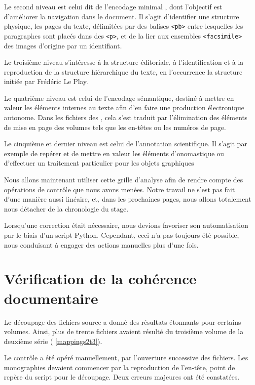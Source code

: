 Le second niveau est celui dit de l'encodage \og minimal \fg, dont l'objectif est d'améliorer la navigation dans le document. Il s'agit d'identifier une structure physique, les pages du texte, délimitées par des balises \texttt{<pb>} entre lesquelles les paragraphes sont placés dans des \texttt{<p>}, et de la lier aux ensembles \texttt{<facsimile>} des images d'origine par un identifiant.

Le troisième niveau s'intéresse à la structure éditoriale, \cad{} à l'identification et à la reproduction de la structure hiérarchique du texte, en l'occurrence la structure initiée par Frédéric Le Play.

Le quatrième niveau est celui de l'encodage sémantique, destiné à mettre en valeur les éléments internes au texte afin d'en faire une production électronique autonome. Dans les fichiers des \odm, cela s'est traduit par l'élimination des éléments de mise en page des volumes tels que les en-têtes ou les numéros de page.

Le cinquième et dernier niveau est celui de l'annotation scientifique. Il s'agit par exemple de repérer et de mettre en valeur les éléments d'onomastique ou d'effectuer un traitement particulier pour les objets graphiques

Nous allons maintenant utiliser cette grille d'analyse afin de rendre compte des opérations de contrôle que nous avons menées. Notre travail ne s'est pas fait d'une manière aussi linéaire, et, dans les prochaines pages, nous allons totalement nous détacher de la chronologie du stage. 

Lorsqu'une correction était nécessaire, nous devions favoriser son automatisation par le biais d'un script Python. Cependant, ceci n’a pas toujours été possible, nous conduisant à engager des actions manuelles plus d'une fois.

\section{Vérification de la cohérence documentaire}

Le découpage des fichiers source a donné des résultats étonnants pour certains volumes. Ainsi, plus de trente fichiers avaient résulté du troisième volume de la deuxième série (\ann{} \ref{mappings2t3}).

Le contrôle a été opéré manuellement, par l'ouverture successive des fichiers. Les monographies devaient commencer par la reproduction de l'en-tête, point de repère du script \lse{} pour le découpage. Deux erreurs majeures ont été constatées.

